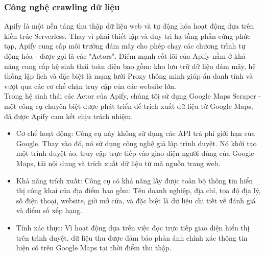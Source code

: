 \subsubsection{Công nghệ crawling dữ liệu}

Apify là một nền tảng thu thập dữ liệu web và tự động hóa hoạt động dựa trên kiến trúc Serverless. Thay vì phải thiết lập và duy trì hạ tầng phần cứng phức tạp, Apify cung cấp môi trường đám mây cho phép chạy các chương trình tự động hóa - được gọi là các "Actors". Điểm mạnh cốt lõi của Apify nằm ở khả năng cung cấp hệ sinh thái toàn diện bao gồm: kho lưu trữ dữ liệu đám mây, hệ thống lập lịch và đặc biệt là mạng lưới Proxy thông minh giúp ẩn danh tính và vượt qua các cơ chế chặn truy cập của các website lớn.\\
Trong hệ sinh thái các Actor của Apify, chúng tôi sử dụng Google Maps Scraper - một công cụ chuyên biệt được phát triển để trích xuất dữ liệu từ Google Maps, đã được Apify cam kết chịu trách nhiệm.
\begin{itemize}
    \item Cơ chế hoạt động: Công cụ này không sử dụng các API trả phí giới hạn của Google. Thay vào đó, nó sử dụng công nghệ giả lập trình duyệt. Nó khởi tạo một trình duyệt ảo, truy cập trực tiếp vào giao diện người dùng của Google Maps, tải nội dung và trích xuất dữ liệu từ mã nguồn trang web.
    \item Khả năng trích xuất: Công cụ có khả năng lấy được toàn bộ thông tin hiển thị công khai của địa điểm bao gồm: Tên doanh nghiệp, địa chỉ, tọa độ địa lý, số điện thoại, website, giờ mở cửa, và đặc biệt là dữ liệu chi tiết về đánh giá và điểm số xếp hạng.
    \item Tính xác thực: Vì hoạt động dựa trên việc đọc trực tiếp giao diện hiển thị trên trình duyệt, dữ liệu thu được đảm bảo phản ánh chính xác thông tin hiện có trên Google Maps tại thời điểm thu thập.
\end{itemize}

